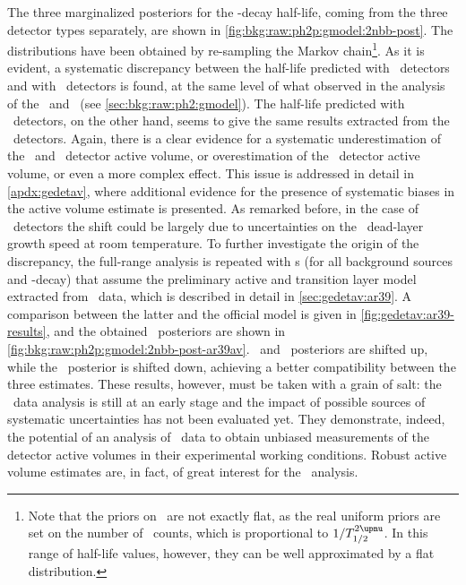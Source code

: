 \blocktitle{\thalftwo}
The three marginalized posteriors for the \nnbb-decay half-life, coming from the three
detector types separately, are shown in \cref{fig:bkg:raw:ph2p:gmodel:2nbb-post}. The
distributions have been obtained by re-sampling the Markov chain\footnote{%
  Note that the priors on \thalftwo\ are not exactly flat, as the real uniform priors are
  set on the number of \nnbb\ counts, which is proportional to $1/\thalftwoM$. In this
  range of half-life values, however, they can be well approximated by a flat
  distribution.
}. As it is evident, a systematic discrepancy between the half-life predicted with \bege\
detectors and with \scoax\ detectors is found, at the same level of what observed in the
analysis of the \enrBEGeII\ and \enrCoaxII\ (see \cref{sec:bkg:raw:ph2:gmodel}). The
half-life predicted with \icoax\ detectors, on the other hand, seems to give the same
results extracted from the \scoax\ detectors. Again, there is a clear evidence for a
systematic underestimation of the \scoax\ and \icoax\ detector active volume, or
overestimation of the \bege\ detector active volume, or even a more complex effect. This
issue is addressed in detail in \cref{apdx:gedetav}, where additional evidence for the
presence of systematic biases in the active volume estimate is presented. As remarked
before, in the case of \bege\ detectors the shift could be largely due to uncertainties on
the \nplus\ dead-layer growth speed at room temperature.
\newpar
To further investigate the origin of the discrepancy, the full-range analysis is repeated
with \pdf{}s (for all background sources and \nnbb-decay) that assume the preliminary
active and transition layer model extracted from \Arl\ data, which is described in detail
in \cref{sec:gedetav:ar39}. A comparison between the latter and the official model is
given in \cref{fig:gedetav:ar39-results}, and the obtained \thalftwo\ posteriors are shown
in \cref{fig:bkg:raw:ph2p:gmodel:2nbb-post-ar39av}. \icoax\ and \scoax\ posteriors are
shifted up, while the \bege\ posterior is shifted down, achieving a better compatibility
between the three estimates. These results, however, must be taken with a grain of salt:
the \Arl\ data analysis is still at an early stage and the impact of possible sources of
systematic uncertainties has not been evaluated yet. They demonstrate, indeed, the
potential of an analysis of \Arl\ data to obtain unbiased measurements of the detector
active volumes in their experimental working conditions. Robust active volume estimates
are, in fact, of great interest for the \nnbb\ analysis.

